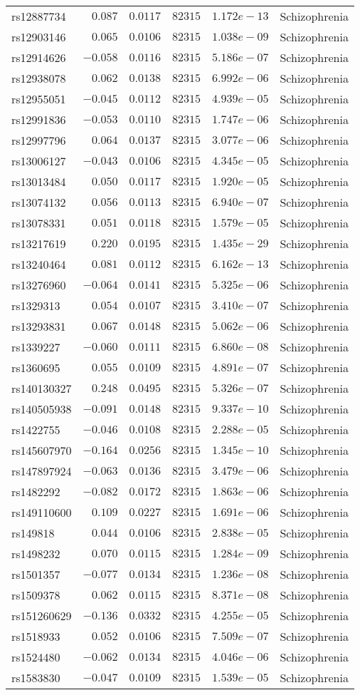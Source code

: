 \begin{tabular}{lrrrrl}
rs12887734&$ 0.087$&$0.0117$&$ 82315$&$1.172e-13$&Schizophrenia\tabularnewline
rs12903146&$ 0.065$&$0.0106$&$ 82315$&$1.038e-09$&Schizophrenia\tabularnewline
rs12914626&$-0.058$&$0.0116$&$ 82315$&$5.186e-07$&Schizophrenia\tabularnewline
rs12938078&$ 0.062$&$0.0138$&$ 82315$&$6.992e-06$&Schizophrenia\tabularnewline
rs12955051&$-0.045$&$0.0112$&$ 82315$&$4.939e-05$&Schizophrenia\tabularnewline
rs12991836&$-0.053$&$0.0110$&$ 82315$&$1.747e-06$&Schizophrenia\tabularnewline
rs12997796&$ 0.064$&$0.0137$&$ 82315$&$3.077e-06$&Schizophrenia\tabularnewline
rs13006127&$-0.043$&$0.0106$&$ 82315$&$4.345e-05$&Schizophrenia\tabularnewline
rs13013484&$ 0.050$&$0.0117$&$ 82315$&$1.920e-05$&Schizophrenia\tabularnewline
rs13074132&$ 0.056$&$0.0113$&$ 82315$&$6.940e-07$&Schizophrenia\tabularnewline
rs13078331&$ 0.051$&$0.0118$&$ 82315$&$1.579e-05$&Schizophrenia\tabularnewline
rs13217619&$ 0.220$&$0.0195$&$ 82315$&$1.435e-29$&Schizophrenia\tabularnewline
rs13240464&$ 0.081$&$0.0112$&$ 82315$&$6.162e-13$&Schizophrenia\tabularnewline
rs13276960&$-0.064$&$0.0141$&$ 82315$&$5.325e-06$&Schizophrenia\tabularnewline
rs1329313&$ 0.054$&$0.0107$&$ 82315$&$3.410e-07$&Schizophrenia\tabularnewline
rs13293831&$ 0.067$&$0.0148$&$ 82315$&$5.062e-06$&Schizophrenia\tabularnewline
rs1339227&$-0.060$&$0.0111$&$ 82315$&$6.860e-08$&Schizophrenia\tabularnewline
rs1360695&$ 0.055$&$0.0109$&$ 82315$&$4.891e-07$&Schizophrenia\tabularnewline
rs140130327&$ 0.248$&$0.0495$&$ 82315$&$5.326e-07$&Schizophrenia\tabularnewline
rs140505938&$-0.091$&$0.0148$&$ 82315$&$9.337e-10$&Schizophrenia\tabularnewline
rs1422755&$-0.046$&$0.0108$&$ 82315$&$2.288e-05$&Schizophrenia\tabularnewline
rs145607970&$-0.164$&$0.0256$&$ 82315$&$1.345e-10$&Schizophrenia\tabularnewline
rs147897924&$-0.063$&$0.0136$&$ 82315$&$3.479e-06$&Schizophrenia\tabularnewline
rs1482292&$-0.082$&$0.0172$&$ 82315$&$1.863e-06$&Schizophrenia\tabularnewline
rs149110600&$ 0.109$&$0.0227$&$ 82315$&$1.691e-06$&Schizophrenia\tabularnewline
rs149818&$ 0.044$&$0.0106$&$ 82315$&$2.838e-05$&Schizophrenia\tabularnewline
rs1498232&$ 0.070$&$0.0115$&$ 82315$&$1.284e-09$&Schizophrenia\tabularnewline
rs1501357&$-0.077$&$0.0134$&$ 82315$&$1.236e-08$&Schizophrenia\tabularnewline
rs1509378&$ 0.062$&$0.0115$&$ 82315$&$8.371e-08$&Schizophrenia\tabularnewline
rs151260629&$-0.136$&$0.0332$&$ 82315$&$4.255e-05$&Schizophrenia\tabularnewline
rs1518933&$ 0.052$&$0.0106$&$ 82315$&$7.509e-07$&Schizophrenia\tabularnewline
rs1524480&$-0.062$&$0.0134$&$ 82315$&$4.046e-06$&Schizophrenia\tabularnewline
rs1583830&$-0.047$&$0.0109$&$ 82315$&$1.539e-05$&Schizophrenia\tabularnewline

\end{tabular}
